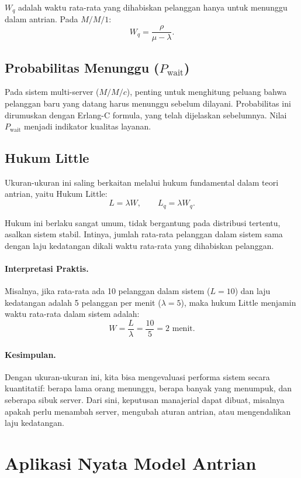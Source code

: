 \documentclass{bukumjh}
\begin{document}
$W_q$ adalah waktu rata-rata yang dihabiskan pelanggan hanya untuk menunggu dalam antrian. Pada $M/M/1$:
\[
W_q = \frac{\rho}{\mu - \lambda}.
\]

\subsection{Probabilitas Menunggu ($P_\text{wait}$)}

Pada sistem multi-server ($M/M/c$), penting untuk menghitung peluang bahwa pelanggan baru yang datang harus menunggu sebelum dilayani. Probabilitas ini dirumuskan dengan {\jsg Erlang-C formula}, yang telah dijelaskan sebelumnya. Nilai $P_\text{wait}$ menjadi indikator kualitas layanan.

\subsection{Hukum Little}

Ukuran-ukuran ini saling berkaitan melalui hukum fundamental dalam teori antrian, yaitu {\jsg Hukum Little}:
\[
L = \lambda W, \qquad L_q = \lambda W_q.
\]

Hukum ini berlaku sangat umum, tidak bergantung pada distribusi tertentu, asalkan sistem stabil. Intinya, jumlah rata-rata pelanggan dalam sistem sama dengan laju kedatangan dikali waktu rata-rata yang dihabiskan pelanggan.

\paragraph{Interpretasi Praktis.}  
Misalnya, jika rata-rata ada 10 pelanggan dalam sistem ($L=10$) dan laju kedatangan adalah 5 pelanggan per menit ($\lambda=5$), maka hukum Little menjamin waktu rata-rata dalam sistem adalah:
\[
W = \frac{L}{\lambda} = \frac{10}{5} = 2 \text{ menit}.
\]

\paragraph{Kesimpulan.}  
Dengan ukuran-ukuran ini, kita bisa mengevaluasi performa sistem secara kuantitatif: berapa lama orang menunggu, berapa banyak yang menumpuk, dan seberapa sibuk server. Dari sini, keputusan manajerial dapat dibuat, misalnya apakah perlu menambah server, mengubah aturan antrian, atau mengendalikan laju kedatangan.

\section{Aplikasi Nyata Model Antrian}
\end{document}
